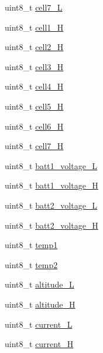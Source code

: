 \begin{DoxyCompactItemize}
uint8\+\_\+t \hyperlink{structHOTT__EAM__MSG__s_ab6ec0a6610caf4086d202a723372322c}{cell7\+\_\+\+L}
\item 
uint8\+\_\+t \hyperlink{structHOTT__EAM__MSG__s_a5253de9eda6a66b23b8a3e7657a23fc3}{cell1\+\_\+\+H}
\item 
uint8\+\_\+t \hyperlink{structHOTT__EAM__MSG__s_aeb575450b00769f43230fcc3bd224d5e}{cell2\+\_\+\+H}
\item 
uint8\+\_\+t \hyperlink{structHOTT__EAM__MSG__s_a7acdb0fe69ebe5290703a5b545add2bc}{cell3\+\_\+\+H}
\item 
uint8\+\_\+t \hyperlink{structHOTT__EAM__MSG__s_a9f84e2368eacefae8bcaffaa5c0e573b}{cell4\+\_\+\+H}
\item 
uint8\+\_\+t \hyperlink{structHOTT__EAM__MSG__s_a21e2b8630de4bd9f0fbdce6c094ebd36}{cell5\+\_\+\+H}
\item 
uint8\+\_\+t \hyperlink{structHOTT__EAM__MSG__s_afae103a095ff7081a4a75b81dc70bb77}{cell6\+\_\+\+H}
\item 
uint8\+\_\+t \hyperlink{structHOTT__EAM__MSG__s_adbab98ada309ece3ad88082a9dc2e132}{cell7\+\_\+\+H}
\item 
uint8\+\_\+t \hyperlink{structHOTT__EAM__MSG__s_a8f59715e221859bd78f346138e8ad536}{batt1\+\_\+voltage\+\_\+\+L}
\item 
uint8\+\_\+t \hyperlink{structHOTT__EAM__MSG__s_ac524a6a66605e59192acd965511f3c0a}{batt1\+\_\+voltage\+\_\+\+H}
\item 
uint8\+\_\+t \hyperlink{structHOTT__EAM__MSG__s_a55a91b805fa4978d921adb13f2061fdf}{batt2\+\_\+voltage\+\_\+\+L}
\item 
uint8\+\_\+t \hyperlink{structHOTT__EAM__MSG__s_a05310f6efb5b27a5394f49743ae7e885}{batt2\+\_\+voltage\+\_\+\+H}
\item 
uint8\+\_\+t \hyperlink{structHOTT__EAM__MSG__s_ab2403b2e6d20294e9b9415f9c4a496a4}{temp1}
\item 
uint8\+\_\+t \hyperlink{structHOTT__EAM__MSG__s_a20a4cd589d7ca3e6f43f9589de95f29d}{temp2}
\item 
uint8\+\_\+t \hyperlink{structHOTT__EAM__MSG__s_ab62d1fe0515c9f84d13ecda37f64f83e}{altitude\+\_\+\+L}
\item 
uint8\+\_\+t \hyperlink{structHOTT__EAM__MSG__s_a72ea1260f429d27f84d92afecf1e82d3}{altitude\+\_\+\+H}
\item 
uint8\+\_\+t \hyperlink{structHOTT__EAM__MSG__s_a4ebe1e6eefaaa89cca3de61f713f2e01}{current\+\_\+\+L}
\item 
uint8\+\_\+t \hyperlink{structHOTT__EAM__MSG__s_ac0121206b11e0452e405ded62045e0f3}{current\+\_\+\+H}

\end{DoxyCompactItemize}
